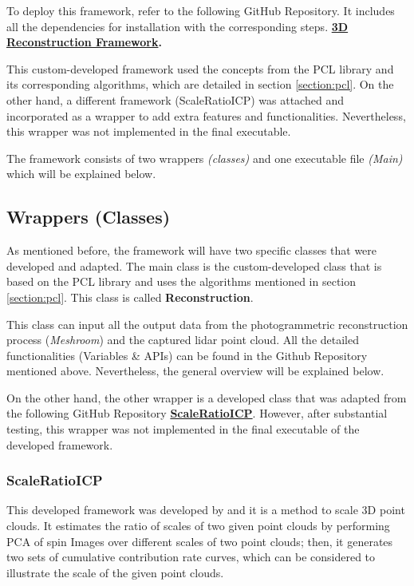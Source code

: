 \documentclass[12pt]{report}
\begin{document}
To deploy this framework, refer to the following GitHub Repository. It includes all the dependencies for installation with the corresponding steps. 
\textbf{\href{https://github.com/esteban-andrade/3D-Reconstructrion-Scanner} {3D Reconstruction Framework}.}

This custom-developed framework used the concepts from the PCL library and its corresponding algorithms, which are detailed in section \ref{section:pcl}.
On the other hand, a different framework (ScaleRatioICP) was attached and incorporated as a wrapper to add extra features and functionalities.
Nevertheless, this wrapper was not implemented in the final executable. 

The framework consists of two wrappers \textit{(classes)} and one executable file \textit{(Main)} which will be explained below.






\subsection{Wrappers (Classes)}
As mentioned before, the framework will have two specific classes that were developed and adapted.
The main class is the custom-developed class that is based on the PCL library and uses the algorithms mentioned in section \ref{section:pcl}. This class is called \textbf{Reconstruction}.

This class can input all the output data from the photogrammetric reconstruction process (\textit{Meshroom}) and the captured lidar point cloud.
All the detailed functionalities (Variables \& APIs) can be found in the Github Repository mentioned above. Nevertheless, the general overview will be explained below. 

On the other hand, the other wrapper is a developed class that was adapted from the following GitHub Repository \textbf{\href{https://github.com/linbaowei/ScaleRatioICP} {ScaleRatioICP}}.
However, after substantial testing, this wrapper was not implemented in the final executable of the developed framework. 




\subsubsection{ScaleRatioICP}
This developed framework was developed by  and it is a method to scale 3D point clouds. 
It estimates the ratio of scales of two given point clouds by performing PCA of spin Images over different scales of two point clouds; then, it generates two sets of cumulative contribution rate curves, which can be considered
to illustrate the scale of the given point clouds. 
\end{document}
